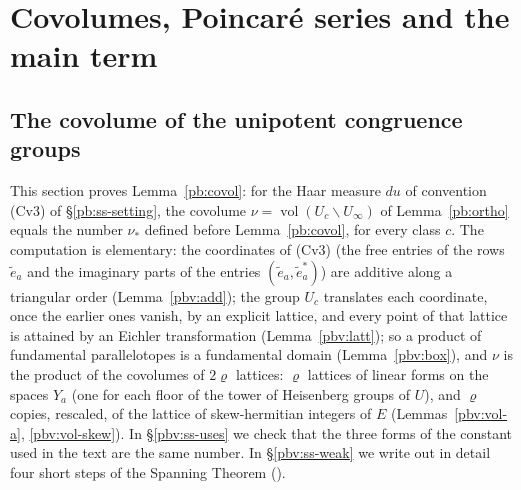 \documentclass[10pt]{amsart}
\theoremstyle{definition}
\theoremstyle{remark}
\providecommand{\auGL}{\mathrm{GL}}
\providecommand{\auPl}{\Phi}
\providecommand{\auU}{\mathrm U}
\providecommand{\aubar}[1]{\overline{#1}}
\begin{document}
\section{Covolumes, Poincar\'e series and the main term}\label{B1:g2}
\providecommand{\auO}{\mathcal O}
\providecommand{\auPl}{\Phi}
\providecommand{\auU}{\mathrm U}
\providecommand{\auGL}{\mathrm{GL}}
\providecommand{\auA}{\mathbb A}
\providecommand{\aurd}{\mathrm{rd}_E}
\providecommand{\aubar}[1]{\overline{#1}}
\providecommand{\pbvol}{\operatorname{vol}}
\providecommand{\pbUb}{\overline U}
\providecommand{\auNm}{\operatorname{Nm}}
\providecommand{\pbg}{\mathsf g}
\providecommand{\pffOT}{\auO_T}
\providecommand{\pfrG}{\mathsf G}
\providecommand{\pfrN}{\mathsf N}
\providecommand{\pgnD}{\mathfrak d}
\providecommand{\pgnd}{\operatorname{d}}
\providecommand{\pbvO}{\widehat{\auO}}
\providecommand{\pbvL}{\mathsf L}
\providecommand{\pbvcov}{\operatorname{covol}}
\providecommand{\pbvE}{\mathsf E}

\subsection{The covolume of the unipotent congruence groups}\label{pbv:sec}

This section proves Lemma~\ref{pb:covol}: for the Haar measure $du$ of convention (Cv3) of
\S\ref{pb:ss-setting}, the covolume $\nu=\pbvol(U_c\backslash U_\infty)$ of Lemma~\ref{pb:ortho} equals
the number $\nu_*$ defined before Lemma~\ref{pb:covol}, for every class $c$. The computation is
elementary: the coordinates of (Cv3) (the free entries of the rows $\tilde e_a$ and the imaginary
parts of the entries $(\tilde e_a,\tilde e_a^*)$) are additive along a triangular order
(Lemma~\ref{pbv:add}); the group $U_c$ translates each coordinate, once the earlier ones vanish, by an
explicit lattice, and every point of that lattice is attained by an Eichler transformation
(Lemma~\ref{pbv:latt}); so a product of fundamental parallelotopes is a fundamental domain
(Lemma~\ref{pbv:box}), and $\nu$ is the product of the covolumes of $2\varrho$ lattices: $\varrho$
lattices of linear forms on the spaces $Y_a$ (one for each floor of the tower of Heisenberg groups
of $U$), and $\varrho$ copies, rescaled, of the lattice of skew-hermitian integers of $E$
(Lemmas~\ref{pbv:vol-a}, \ref{pbv:vol-skew}). In \S\ref{pbv:ss-uses} we check that the three forms
of the constant used in the text are the same number. In \S\ref{pbv:ss-weak} we write out in detail four short
steps of the Spanning Theorem ({\cite[Theorem~14.14]{P46}}).
\end{document}
